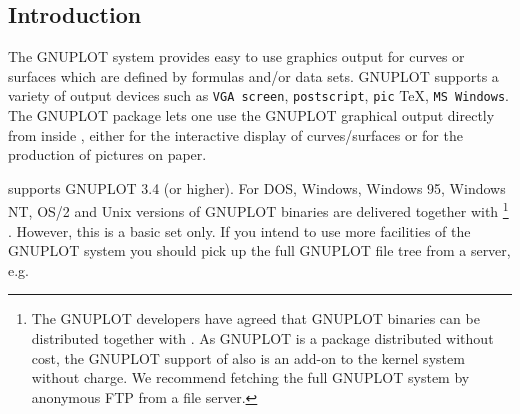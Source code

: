 
\newcommand{\VERYLARGE}{\fontsize{40}{65pt}\selectfont}

\def\xr{{\tt XR}}


\iffalse
\newpage
  Gnuplot
\newpage
\title{GNUPLOT Interface for REDUCE\\Version 4}
\author{Herbert Melenk \\ 
Konrad--Zuse--Zentrum f\"ur Informationstechnik Berlin \\
E--mail: Melenk@zib.de}
\maketitle

\fi



\subsection{Introduction}

The GNUPLOT system provides easy to use graphics output 
for curves or surfaces which are defined by  
formulas and/or data sets. GNUPLOT supports 
a variety of output devices such as
\verb+VGA screen+, \verb+postscript+, \verb+pic+ \TeX,
\verb+MS Windows+.
The {\REDUCE} GNUPLOT package lets one use the GNUPLOT
graphical output directly from inside {\REDUCE}, either for
the interactive display of curves/surfaces or for the production
of pictures on paper. 

{\REDUCE} supports GNUPLOT 3.4 (or higher). 
For  DOS, Windows, Windows 95, Windows NT, OS/2
and Unix versions of {\REDUCE}
GNUPLOT binaries are delivered together with {\REDUCE}
\footnote{The GNUPLOT developers have agreed that GNUPLOT
binaries can be distributed together with {\REDUCE}.
As GNUPLOT is a package distributed without cost,
the GNUPLOT support of {\REDUCE} also is an
add-on to the {\REDUCE} kernel system without charge.
We recommend fetching the full GNUPLOT system 
by anonymous FTP from a file server.
} %
. However, this is a basic set only. 
If you intend to use more facilities of the GNUPLOT
system you should pick up the full GNUPLOT file tree
from a server, e.g.

